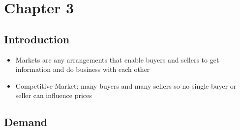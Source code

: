 \documentclass[11pt]{article}
\begin{document}
\section{Chapter 3}
\label{sec:orgbefe3fc}
\subsection{Introduction}
\label{sec:org28c3925}
\begin{itemize}
\item Markets are any arrangements that enable buyers and sellers to get information
and do business with each other
\item Competitive Market: many buyers and many sellers so no single buyer or seller can
influence prices
\end{itemize}
\subsection{Demand}
\label{sec:orgfb05e3c}
\end{document}
